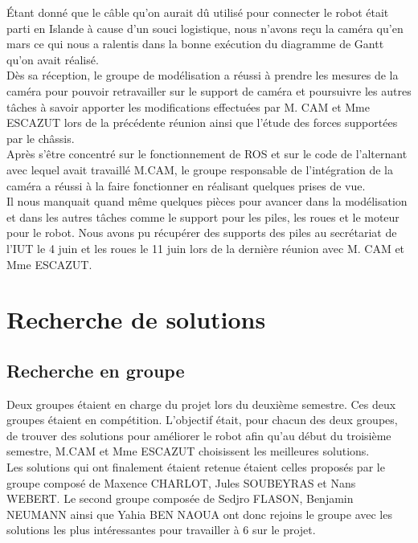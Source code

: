 Étant donné que le câble qu’on aurait dû utilisé pour connecter le robot était parti en Islande à cause d’un souci logistique, nous n’avons reçu la caméra qu’en mars ce qui nous a ralentis dans la bonne exécution du diagramme de Gantt qu’on avait réalisé.\\

Dès sa réception, le groupe de modélisation a réussi à prendre les mesures de la caméra pour pouvoir retravailler sur le support de caméra et poursuivre les autres tâches à savoir apporter les modifications effectuées par M. CAM et Mme ESCAZUT lors de la précédente réunion ainsi que l'étude des forces supportées par le châssis.\\ 

Après s’être concentré sur le fonctionnement de ROS et sur le code de l’alternant avec lequel avait travaillé M.CAM, le groupe responsable de l’intégration de la caméra a réussi à la faire fonctionner en réalisant quelques prises de vue.\\

Il nous manquait quand même quelques pièces pour avancer dans la modélisation et dans les autres tâches comme le support pour les piles, les roues et le moteur pour le robot. Nous avons pu récupérer des supports des piles au secrétariat de l’IUT le 4 juin et les roues le 11 juin lors de la dernière réunion avec M. CAM et Mme ESCAZUT. 

\section{Recherche de solutions}

\subsection{Recherche en groupe}


Deux groupes étaient en charge du projet lors du deuxième semestre. Ces deux groupes étaient en compétition. L'objectif était, pour chacun des deux groupes, de trouver des solutions pour améliorer le robot afin qu'au début du troisième semestre, M.CAM et Mme ESCAZUT choisissent les meilleures solutions.\\

Les solutions qui ont finalement étaient retenue étaient celles proposés par le groupe composé de Maxence CHARLOT, Jules SOUBEYRAS et Nans WEBERT. Le second groupe composée de Sedjro FLASON, Benjamin NEUMANN ainsi que Yahia BEN NAOUA ont donc rejoins le groupe avec les solutions les plus intéressantes pour travailler à 6 sur le projet.\\

